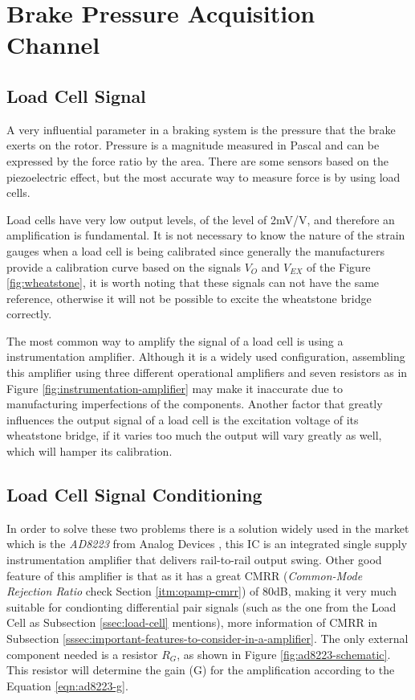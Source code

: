 \section{Brake Pressure Acquisition Channel}\label{sec:brake-pressure-acquisition-channel}

\subsection{Load Cell Signal}\label{ssec:load-cell-signal}

	A very influential parameter in a braking system is the pressure that the brake exerts on the rotor. Pressure is a magnitude measured in Pascal and can be expressed by the force ratio by the area. There are some sensors based on the piezoelectric effect, but the most accurate way to measure force is by using load cells.
	\par
	Load cells have very low output levels, of the level of 2mV/V, and therefore an amplification is fundamental. It is not necessary to know the nature of the strain gauges when a load cell is being calibrated since generally the manufacturers provide a calibration curve based on the signals $V_{O}$ and $V_{EX}$ of the Figure \ref{fig:wheatstone}, it is worth noting that these signals can not have the same reference, otherwise it will not be possible to excite the wheatstone bridge correctly.
	\par
	The most common way to amplify the signal of a load cell is using a instrumentation amplifier. Although it is a widely used configuration, assembling this amplifier using three different operational amplifiers and seven resistors as in Figure \ref{fig:instrumentation-amplifier} may make it inaccurate due to manufacturing imperfections of the components. Another factor that greatly influences the output signal of a load cell is the excitation voltage of its wheatstone bridge, if it varies too much the output will vary greatly as well, which will hamper its calibration.

\subsection{Load Cell Signal Conditioning}\label{ssec:load-cell-signal-conditioning}
		
	In order to solve these two problems there is a solution widely used in the market which is the \textit{AD8223} from Analog Devices \cite{ad8223-datasheet}, this IC is an integrated single supply instrumentation amplifier that delivers rail-to-rail output swing. Other good feature of this amplifier is that as it has a great CMRR (\textit{Common-Mode Rejection Ratio} check Section \ref{itm:opamp-cmrr}) of 80dB, making it very much suitable for condionting differential pair signals (such as the one from the Load Cell as Subsection \ref{ssec:load-cell} mentions), more information of CMRR in Subsection \ref{sssec:important-features-to-consider-in-a-amplifier}. The only external component needed is a resistor $R_{G}$, as shown in Figure \ref{fig:ad8223-schematic}. This resistor will determine the gain (G) for the amplification according to the Equation \ref{eqn:ad8223-g}.
	

